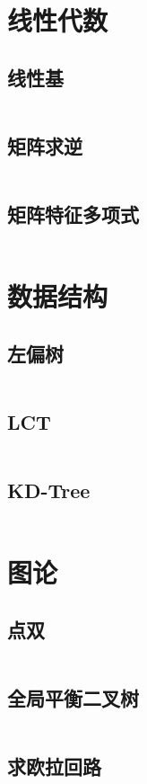 \documentclass[a4paper,9]{article}
\begin{document}
\section{线性代数}
\subsection{线性基}
\inputminted[breaklines]{c++}{source/linear-algebra/lb.cpp}
\subsection{矩阵求逆}
\inputminted[breaklines]{c++}{source/linear-algebra/matrix_inversion.cpp}
\subsection{矩阵特征多项式}
\inputminted[breaklines]{c++}{source/linear-algebra/charac-poly.cpp}

\section{数据结构}
\subsection{左偏树}
\inputminted[breaklines]{c++}{source/data-structure/leftist-tree.cpp}
\subsection{LCT}
\inputminted[breaklines]{c++}{source/data-structure/lct.cpp}
\subsection{KD-Tree}
\inputminted[breaklines]{c++}{source/data-structure/kd-tree.cpp}

\section{图论}
\subsection{点双}
\inputminted[breaklines]{c++}{source/graph/bcc.cpp}
\subsection{全局平衡二叉树}
\inputminted[breaklines]{c++}{source/graph/全局平衡二叉树.cpp}
\subsection{求欧拉回路}
\inputminted[breaklines]{c++}{source/graph/euler-tour.cpp}
\end{document}
